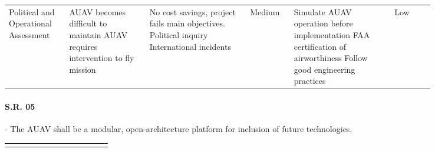\begin{fullwidth}
\begin{landscape}
{\begin{longtable}{| L{0.12\linewidth} | L{0.16\linewidth} |  L{0.20\linewidth} | L{0.08\linewidth} | L{0.20\linewidth} | L{0.08\linewidth} |}
        \hline
        Political and Operational Assessment & AUAV becomes difficult to maintain \newline AUAV requires intervention to fly mission & No cost savings, project fails main objectives. \newline Political inquiry \newline International incidents &  Medium & Simulate AUAV operation before implementation \newline FAA certification of airworthiness \newline Follow good engineering practices &  Low
        \label{tab:sr04_feasibility}
    \end{longtable}
    }
    
    \newpage
    
    
    \paragraph{S.R. 05} - The AUAV shall be a modular, open-architecture platform for inclusion of future technologies.
    
    {\fontsize{10pt}{11pt}\selectfont
    \begin{longtable}{| L{0.12\linewidth} | L{0.16\linewidth} |  L{0.20\linewidth} | L{0.08\linewidth} | L{0.20\linewidth} | L{0.08\linewidth} |}
        \hline \endlastfoot
        

\end{longtable}}
\end{landscape}
\end{fullwidth}
